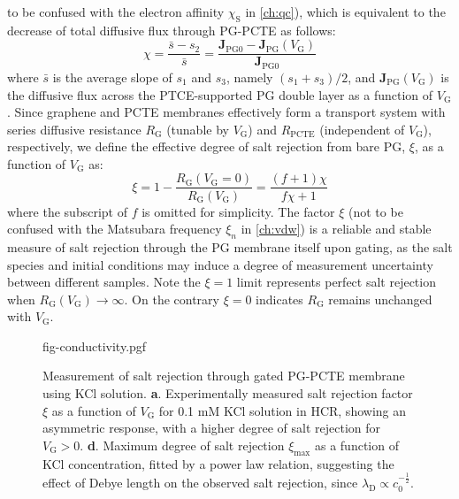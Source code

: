 to be confused with the electron affinity $\chi_{\mathrm{S}}$ in
\autoref{ch:qc}), which is equivalent to the decrease of total
diffusive flux through PG-PCTE as follows:
\begin{equation}
  \label{eq:np-rejection}
  \chi = \frac{\bar{s} - s_{2}}{\bar{s}} = \frac{\symbf{J}_{\mathrm{PG0}}
    - \symbf{J}_{\mathrm{PG}}(V_{\mathrm{G}})}{\symbf{J}_{\mathrm{PG0}}}
\end{equation}
where $\bar{s}$ is the average slope of $s_{1}$ and $s_{3}$, namely
$(s_{1} + s_{3})/2$, and
$\symbf{J}_{\mathrm{PG}}(V_{\mathrm{G}})$ is the diffusive flux
across the PTCE-supported PG double layer as a function of
$V_{\mathrm{G}}$. Since graphene and PCTE membranes effectively form a
transport system with series diffusive resistance $R_{\mathrm{G}}$
(tunable by $V_{\mathrm{G}}$) and $R_{\mathrm{PCTE}}$ (independent of
$V_{\mathrm{G}}$), respectively, we define the effective degree of
salt rejection from bare PG, $\xi$, as a function of $V_{\mathrm{G}}$ as:
\begin{equation}
\label{eq:np-xi-def}
\xi = 1 - \frac{R_{\mathrm{G}}(V_{\mathrm{G}}=0)}{R_{\mathrm{G}}(V_{\mathrm{G}})} = \frac{(f+1) \chi}{f \chi + 1}
\end{equation}
where the subscript of $f$ is omitted for simplicity. The factor $\xi$
(not to be confused with the Matsubara frequency $\xi_{n}$ in
\autoref{ch:vdw}) is a reliable and stable measure of salt rejection
through the PG membrane itself upon gating, as the salt species and
initial conditions may induce a degree of measurement uncertainty
between different samples. Note the $\xi=1$ limit represents perfect
salt rejection when $R_{\mathrm{G}}(V_{\mathrm{G}}) \to \infty$. On
the contrary $\xi=0$ indicates $R_{\mathrm{G}}$ remains unchanged with
$V_{\mathrm{G}}$.
\begin{figure}[H]
  \centering
   {fig-conductivity.pgf}
   \caption{Measurement of salt rejection through gated PG-PCTE
     membrane using KCl solution.  \textbf{a}. Experimentally measured
     salt rejection factor $\xi$ as a function of $V_{\mathrm{G}}$ for
     0.1 mM KCl solution in HCR, showing an asymmetric response, with
     a higher degree of salt rejection for
     $V_{\mathrm{G}}>0$. %
     \textbf{d}. Maximum degree of salt rejection $\xi_{\mathrm{max}}$ as a function of KCl
     concentration, fitted by a power law relation, suggesting the
     effect of Debye length on the observed salt rejection, since
     $\lambda_{\mathrm{D}} \propto c_{0}^{-\frac{1}{2}}$.}
  \label{fig:np-conductivity-rej} 
\end{figure}

